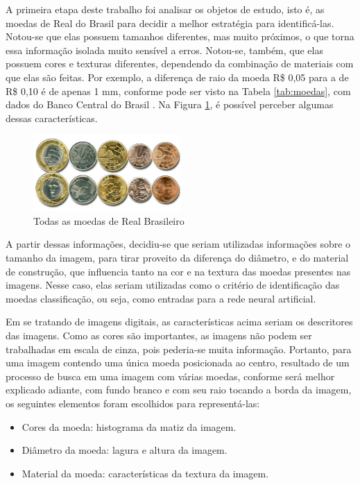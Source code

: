 \documentclass[10pt,journal,compsoc]{IEEEtran}
\begin{document}
A primeira etapa deste trabalho foi analisar os objetos de estudo, isto é, as moedas de Real do Brasil para decidir a melhor estratégia para identificá-las. Notou-se que elas possuem tamanhos diferentes, mas muito próximos, o que torna essa informação isolada muito sensível a erros. Notou-se, também, que elas possuem cores e texturas diferentes, dependendo da combinação de materiais com que elas são feitas. Por exemplo, a diferença  de raio da moeda R\$ 0,05 para a de R\$ 0,10 é de apenas 1 mm, conforme pode ser visto na Tabela \ref{tab:moedas}, com dados do Banco Central do Brasil \cite{bcb}. Na Figura \ref{fig:moedas-real}, é possível perceber algumas dessas características.


\begin{figure}[ht]
\centering
\caption{Todas as moedas de Real Brasileiro}
\label{fig:moedas-real}
\includegraphics[width=0.5\textwidth]{moedas-real.jpg}
\end{figure}


A partir dessas informações, decidiu-se que seriam utilizadas informações sobre o tamanho da imagem, para tirar proveito da diferença do diâmetro, e do material de construção, que influencia tanto na cor e na textura das moedas presentes nas imagens. Nesse caso, elas seriam utilizadas como o critério de identificação das moedas classificação, ou seja, como entradas para a rede neural artificial. 

Em se tratando de imagens digitais, as características acima seriam os descritores das imagens. Como as cores são importantes, as imagens não podem ser trabalhadas em escala de cinza, pois pederia-se muita informação. Portanto, para uma imagem contendo uma única moeda posicionada ao centro, resultado de um processo de busca em uma imagem com várias moedas, conforme será melhor explicado adiante, com fundo branco e com seu raio tocando a borda da imagem, os seguintes elementos foram escolhidos para representá-las:

\begin{itemize}  
\item Cores da moeda: histograma da matiz da imagem. 
\item Diâmetro da moeda: lagura e altura da imagem.
\item Material da moeda: características da textura da imagem.
\end{itemize}
\end{document}
